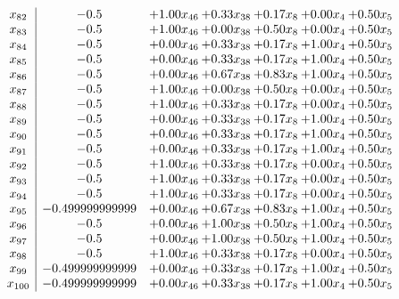 \documentclass[8pt]{article}
\begin{document}
\[\begin{array}{c| c c@{\hskip 2pt} c@{\hskip 2pt} c@{\hskip 2pt} c@{\hskip 2pt} c@{\hskip 2pt} }
 x_{82}   &  -0.5 & +  1.00 x_{46} & +  0.33 x_{38} & +  0.17 x_{8} & +  0.00 x_{4} & +  0.50 x_{5}\\
 x_{83}   &  -0.5 & +  1.00 x_{46} & +  0.00 x_{38} & +  0.50 x_{8} & +  0.00 x_{4} & +  0.50 x_{5}\\
 x_{84}   &  -0.5 & +  0.00 x_{46} & +  0.33 x_{38} & +  0.17 x_{8} & +  1.00 x_{4} & +  0.50 x_{5}\\
 x_{85}   &  -0.5 & +  0.00 x_{46} & +  0.33 x_{38} & +  0.17 x_{8} & +  1.00 x_{4} & +  0.50 x_{5}\\
 x_{86}   &  -0.5 & +  0.00 x_{46} & +  0.67 x_{38} & +  0.83 x_{8} & +  1.00 x_{4} & +  0.50 x_{5}\\
 x_{87}   &  -0.5 & +  1.00 x_{46} & +  0.00 x_{38} & +  0.50 x_{8} & +  0.00 x_{4} & +  0.50 x_{5}\\
 x_{88}   &  -0.5 & +  1.00 x_{46} & +  0.33 x_{38} & +  0.17 x_{8} & +  0.00 x_{4} & +  0.50 x_{5}\\
 x_{89}   &  -0.5 & +  0.00 x_{46} & +  0.33 x_{38} & +  0.17 x_{8} & +  1.00 x_{4} & +  0.50 x_{5}\\
 x_{90}   &  -0.5 & +  0.00 x_{46} & +  0.33 x_{38} & +  0.17 x_{8} & +  1.00 x_{4} & +  0.50 x_{5}\\
 x_{91}   &  -0.5 & +  0.00 x_{46} & +  0.33 x_{38} & +  0.17 x_{8} & +  1.00 x_{4} & +  0.50 x_{5}\\
 x_{92}   &  -0.5 & +  1.00 x_{46} & +  0.33 x_{38} & +  0.17 x_{8} & +  0.00 x_{4} & +  0.50 x_{5}\\
 x_{93}   &  -0.5 & +  1.00 x_{46} & +  0.33 x_{38} & +  0.17 x_{8} & +  0.00 x_{4} & +  0.50 x_{5}\\
 x_{94}   &  -0.5 & +  1.00 x_{46} & +  0.33 x_{38} & +  0.17 x_{8} & +  0.00 x_{4} & +  0.50 x_{5}\\
 x_{95}   &  -0.499999999999 & +  0.00 x_{46} & +  0.67 x_{38} & +  0.83 x_{8} & +  1.00 x_{4} & +  0.50 x_{5}\\
 x_{96}   &  -0.5 & +  0.00 x_{46} & +  1.00 x_{38} & +  0.50 x_{8} & +  1.00 x_{4} & +  0.50 x_{5}\\
 x_{97}   &  -0.5 & +  0.00 x_{46} & +  1.00 x_{38} & +  0.50 x_{8} & +  1.00 x_{4} & +  0.50 x_{5}\\
 x_{98}   &  -0.5 & +  1.00 x_{46} & +  0.33 x_{38} & +  0.17 x_{8} & +  0.00 x_{4} & +  0.50 x_{5}\\
 x_{99}   &  -0.499999999999 & +  0.00 x_{46} & +  0.33 x_{38} & +  0.17 x_{8} & +  1.00 x_{4} & +  0.50 x_{5}\\
 x_{100}   &  -0.499999999999 & +  0.00 x_{46} & +  0.33 x_{38} & +  0.17 x_{8} & +  1.00 x_{4} & +  0.50 x_{5}\\

\end{array}\]
\end{document}
